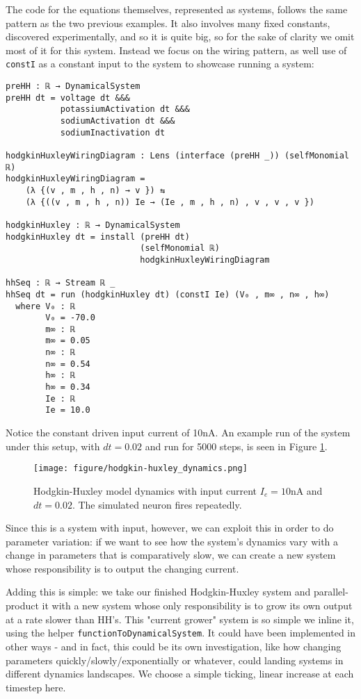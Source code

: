 The code for the equations themselves, represented as systems, follows the same pattern as the two previous examples. It also involves many fixed constants, discovered experimentally, and so it is quite big, so for the sake of clarity we omit most of it for this system. Instead we focus on the wiring pattern, as well use of \texttt{constI} as a constant input to the system to showcase running a system:
\begin{verbatim}
preHH : ℝ → DynamicalSystem
preHH dt = voltage dt &&& 
           potassiumActivation dt &&& 
           sodiumActivation dt &&&
           sodiumInactivation dt

hodgkinHuxleyWiringDiagram : Lens (interface (preHH _)) (selfMonomial ℝ)
hodgkinHuxleyWiringDiagram = 
    (λ {(v , m , h , n) → v }) ⇆ 
    (λ {((v , m , h , n)) Ie → (Ie , m , h , n) , v , v , v })

hodgkinHuxley : ℝ → DynamicalSystem
hodgkinHuxley dt = install (preHH dt)
                           (selfMonomial ℝ)
                           hodgkinHuxleyWiringDiagram

hhSeq : ℝ → Stream ℝ _
hhSeq dt = run (hodgkinHuxley dt) (constI Ie) (V₀ , m∞ , n∞ , h∞)
  where V₀ : ℝ
        V₀ = -70.0
        m∞ : ℝ
        m∞ = 0.05
        n∞ : ℝ
        n∞ = 0.54
        h∞ : ℝ
        h∞ = 0.34
        Ie : ℝ
        Ie = 10.0
\end{verbatim}

Notice the constant driven input current of 10nA. An example run of the system under this setup, with $dt = 0.02$ and run for 5000 steps, is seen in Figure \ref{fig:hhdynamics}.

\begin{figure}
    \centering
    \texttt{[image: figure/hodgkin-huxley\_dynamics.png]}
    \caption{Hodgkin-Huxley model dynamics with input current $I_e = 10$nA and $dt = 0.02$. The simulated neuron fires repeatedly.}
    \label{fig:hhdynamics}
\end{figure}

Since this is a system with input, however, we can exploit this in order to do parameter variation: if we want to see how the system's dynamics vary with a change in parameters that is comparatively slow, we can create a new system whose responsibility is to output the changing current.

Adding this is simple: we take our finished Hodgkin-Huxley system and parallel-product it with a new system whose only responsibility is to grow its own output at a rate slower than HH's. This "current grower" system is so simple we inline it, using the helper \texttt{functionToDynamicalSystem}. It could have been implemented in other ways - and in fact, this could be its own investigation, like how changing parameters quickly/slowly/exponentially or whatever, could landing systems in different dynamics landscapes. We choose a simple ticking, linear increase at each timestep here.

